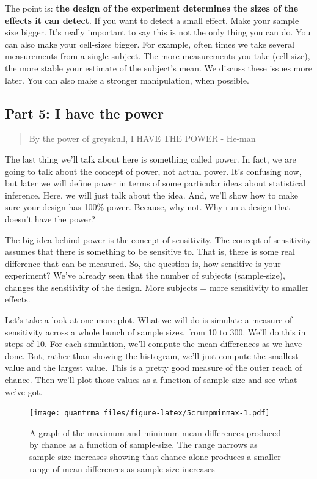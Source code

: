 \documentclass[
]{book}
\begin{document}
The point is: \textbf{the design of the experiment determines the sizes of the effects it can detect}. If you want to detect a small effect. Make your sample size bigger. It's really important to say this is not the only thing you can do. You can also make your cell-sizes bigger. For example, often times we take several measurements from a single subject. The more measurements you take (cell-size), the more stable your estimate of the subject's mean. We discuss these issues more later. You can also make a stronger manipulation, when possible.

\hypertarget{part-5-i-have-the-power}{%
\subsection{Part 5: I have the power}\label{part-5-i-have-the-power}}

\begin{quote}
By the power of greyskull, I HAVE THE POWER - He-man
\end{quote}

The last thing we'll talk about here is something called power. In fact, we are going to talk about the concept of power, not actual power. It's confusing now, but later we will define power in terms of some particular ideas about statistical inference. Here, we will just talk about the idea. And, we'll show how to make sure your design has 100\% power. Because, why not. Why run a design that doesn't have the power?

The big idea behind power is the concept of sensitivity. The concept of sensitivity assumes that there is something to be sensitive to. That is, there is some real difference that can be measured. So, the question is, how sensitive is your experiment? We've already seen that the number of subjects (sample-size), changes the sensitivity of the design. More subjects = more sensitivity to smaller effects.

Let's take a look at one more plot. What we will do is simulate a measure of sensitivity across a whole bunch of sample sizes, from 10 to 300. We'll do this in steps of 10. For each simulation, we'll compute the mean differences as we have done. But, rather than showing the histogram, we'll just compute the smallest value and the largest value. This is a pretty good measure of the outer reach of chance. Then we'll plot those values as a function of sample size and see what we've got.

\begin{figure}
\centering
\texttt{[image: quantrma\_files/figure-latex/5crumpminmax-1.pdf]}
\caption{\label{fig:5crumpminmax}A graph of the maximum and minimum mean differences produced by chance as a function of sample-size. The range narrows as sample-size increases showing that chance alone produces a smaller range of mean differences as sample-size increases}
\end{figure}
\end{document}
